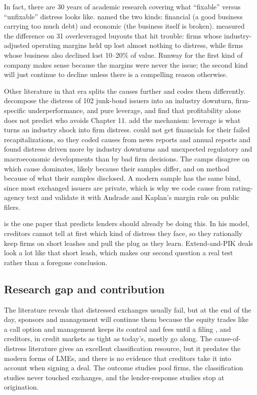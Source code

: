 \documentclass[12pt]{article}
\begin{document}
In fact, there are 30 years of academic research covering what ``fixable'' versus ``unfixable'' distress looks like. \citet{wruck1990} named the two kinds: financial (a good business carrying too much debt) and economic (the business itself is broken). \citet{andrade1998} measured the difference on 31 overleveraged buyouts that hit trouble: firms whose industry-adjusted operating margins held up lost almost nothing to distress, while firms whose business also declined lost 10--20\% of value. Runway for the first kind of company makes sense because the margins were never the issue; the second kind will just continue to decline unless there is a compelling reason otherwise.

Other literature in that era splits the causes further and codes them differently. \citet{asquith1994} decompose the distress of 102 junk-bond issuers into an industry downturn, firm-specific underperformance, and pure leverage, and find that profitability alone does not predict who avoids Chapter 11. \citet{opler1994} add the mechanism: leverage is what turns an industry shock into firm distress. \citet{denis1995} could not get financials for their failed recapitalizations, so they coded causes from news reports and annual reports and found distress driven more by industry downturns and unexpected regulatory and macroeconomic developments than by bad firm decisions. The camps disagree on which cause dominates, likely because their samples differ, and on method because of what their samples disclosed. A modern sample has the same bind, since most exchanged issuers are private, which is why we code cause from rating-agency text and validate it with Andrade and Kaplan's margin rule on public filers.

\citet{kahl2002} is the one paper that predicts lenders should already be doing this. In his model, creditors cannot tell at first which kind of distress they face, so they rationally keep firms on short leashes and pull the plug as they learn. Extend-and-PIK deals look a lot like that short leash, which makes our second question a real test rather than a foregone conclusion.

\subsection{Research gap and contribution}

The literature reveals that distressed exchanges usually fail, but at the end of the day, sponsors and management will continue them because the equity trades like a call option and management keeps its control and fees until a filing \citep{roerotaru2026}, and creditors, in credit markets as tight as today's, mostly go along. The cause-of-distress literature gives an excellent classification resource, but it predates the modern forms of LMEs, and there is no evidence that creditors take it into account when signing a deal. The outcome studies pool firms, the classification studies never touched exchanges, and the lender-response studies stop at origination.
\end{document}
